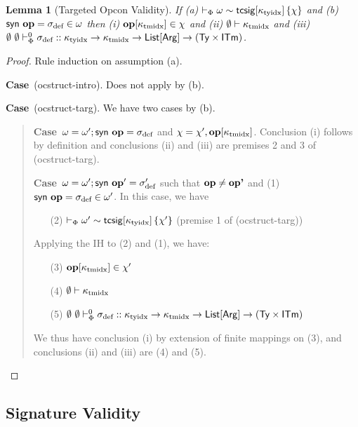 \documentclass[12pt]{article}
\newtheorem{lemma}{Lemma}
\newcommand{\pfcase}[1]{\textbf{Case}~#1. }
\begin{document}
\begin{lemma}[Targeted Opcon Validity]
\label{lemma:targeted-opcon-validity}
If (a) $\vdash_\Phi \omega \sim {\sf tcsig}[\kappa_\text{tyidx}]\,\{\chi\}$ and (b) ${\sf syn}~\textbf{op}=\sigma_\text{def} \in \omega$ then (i) $\textbf{op}[\kappa_\text{tmidx}] \in \chi$ and (ii) $\emptyset \vdash \kappa_\text{tmidx}$ and (iii) $
    \emptyset~\emptyset \vdash_{\Phi}^{0} \sigma_\text{def} :: \kappa_\text{tyidx} \rightarrow \kappa_\text{tmidx} \rightarrow {\sf List}[{\sf Arg}] \rightarrow ({\sf Ty} \times {\sf ITm})$.
\end{lemma}
\begin{proof}
Rule induction on assumption (a). 

\pfcase{(ocstruct-intro)} Does not apply by (b).

\pfcase{(ocstruct-targ)} We have two cases by (b).\begin{quote}\pfcase{$\omega=\omega'; {\sf syn}~\textbf{op}=\sigma_\text{def}$ and $\chi=\chi', \textbf{op}[{\kappa_\text{tmidx}}]$} Conclusion (i) follows by definition and conclusions (ii) and (iii) are premises 2 and 3 of (ocstruct-targ).

\pfcase{$\omega=\omega'; {\sf syn}~\textbf{op}'=\sigma_\text{def}'$ such that $\textbf{op}\neq\textbf{op'}$ and (1) ${\sf syn}~\textbf{op}=\sigma_\text{def} \in \omega'$} In this case, we have 
    \begin{enumerate}
    \item[(2)] $\vdash_\Phi \omega' \sim {\sf tcsig}[\kappa_\text{tyidx}]\,\{\chi'\}$ (premise 1 of (ocstruct-targ))
    \end{enumerate}

    Applying the IH to (2) and (1), we have:
    \begin{enumerate}[(1)]
    \item[(3)] $\textbf{op}[\kappa_\text{tmidx}] \in \chi'$
    \item[(4)] $\emptyset \vdash \kappa_\text{tmidx}$
    \item[(5)] $\emptyset~\emptyset \vdash_{\Phi}^{0} \sigma_\text{def} :: \kappa_\text{tyidx} \rightarrow \kappa_\text{tmidx} \rightarrow {\sf List}[{\sf Arg}] \rightarrow ({\sf Ty} \times {\sf ITm})$
    \end{enumerate}

    We thus have conclusion (i) by extension of finite mappings on (3), and conclusions (ii) and (iii) are (4) and (5).
\end{quote}
\end{proof}

\subsection{Signature Validity}
\end{document}

